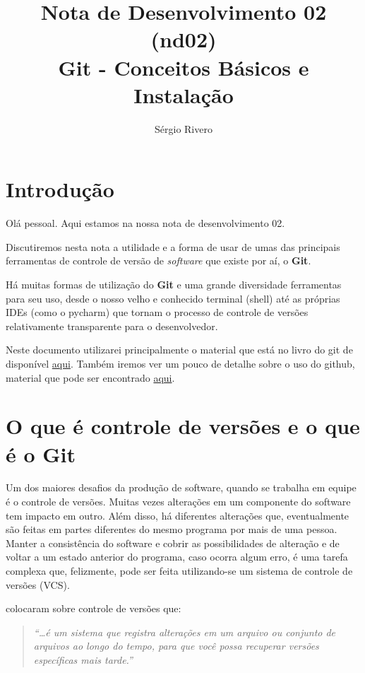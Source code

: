 \documentclass[12pt,a4paper]{article}
\author{Sérgio Rivero}
\title{Nota de Desenvolvimento 02 (nd02) \\ 
		Git - Conceitos Básicos e Instalação}
\begin{document}
\maketitle


\pagebreak

\section{Introdução}

Olá pessoal. Aqui estamos na nossa nota de desenvolvimento 02. 

Discutiremos nesta nota a utilidade e a forma de usar de umas das principais ferramentas de controle de versão de \textit{software} que existe por aí, o \textbf{Git}. 

Há muitas formas de utilização do \textbf{Git} e uma grande diversidade ferramentas para seu uso, desde o nosso velho e conhecido terminal  (shell) até as próprias IDEs (como o pycharm) que tornam o processo de controle de versões relativamente transparente para o desenvolvedor.

Neste documento utilizarei principalmente o material que está no livro do git de  \citet*{Chacon2014} disponível \href{https://git-scm.com/book/en/v2}{aqui}. Também iremos ver um pouco de detalhe sobre o uso do github, material que pode ser encontrado \href{https://lab.github.com/githubtraining/introduction-to-github}{aqui}.

\section{O que é controle de versões e o que é o Git}

Um dos maiores desafios da produção de software, quando se trabalha em equipe é o controle de versões. Muitas vezes alterações em um componente do software tem impacto em outro. Além disso, há diferentes alterações que, eventualmente são feitas em partes diferentes do mesmo programa por mais de uma pessoa. Manter a consistência do software e cobrir as possibilidades de alteração e de voltar a um estado anterior do programa, caso ocorra algum erro, é uma tarefa complexa que, felizmente, pode ser feita utilizando-se um sistema de controle de versões (VCS).

\citet[p. 9]{Chacon2014} colocaram sobre controle de versões que: 
\begin{quotation}
	\textit{
	``\dots é um sistema que registra alterações em um arquivo ou conjunto de arquivos ao longo do tempo, para que você possa recuperar versões específicas mais tarde.''}
\end{quotation}
\end{document}
